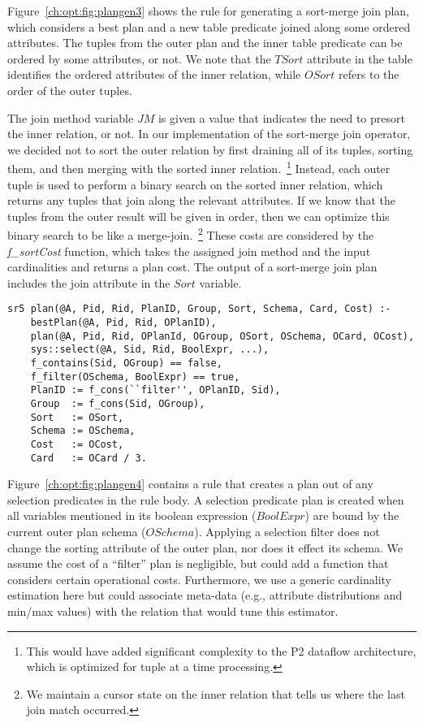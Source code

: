 Figure~\ref{ch:opt:fig:plangen3} shows the rule for generating a sort-merge
join plan, which considers a best plan and a new table predicate joined along
some ordered attributes.  The tuples from the outer plan and the inner table
predicate can be ordered by some attributes, or not.  We note that the $TSort$
attribute in the  table identifies the ordered attributes of the
inner relation, while $OSort$ refers to the order of the outer tuples.  

The join method variable $JM$ is given a value that indicates the need to
presort the inner relation, or not.  In our implementation of the sort-merge
join operator, we decided not to sort the outer relation by first draining all
of its tuples, sorting them, and then merging with the sorted inner
relation.~\footnote{This would have added significant complexity to the P2
dataflow architecture, which is optimized for tuple at a time processing.}
Instead, each outer tuple is used to perform a binary search on the sorted
inner relation, which returns any tuples that join along the relevant
attributes.  If we know that the tuples from the outer result will be given in
order, then we can optimize this binary search to be like a
merge-join.~\footnote{We maintain a cursor state on the inner relation that
tells us where the last join match occurred.} These costs are considered by the
{\em f\_sortCost} function, which takes the assigned join method and the input
cardinalities and returns a plan cost.  The output of a sort-merge join plan
includes the join attribute in the $Sort$ variable.

\begin{figure*}
\ssp
\centering
\begin{lstlisting}
sr5 plan(@A, Pid, Rid, PlanID, Group, Sort, Schema, Card, Cost) :-
    bestPlan(@A, Pid, Rid, OPlanID),
    plan(@A, Pid, Rid, OPlanId, OGroup, OSort, OSchema, OCard, OCost),
    sys::select(@A, Sid, Rid, BoolExpr, ...),
    f_contains(Sid, OGroup) == false,
    f_filter(OSchema, BoolExpr) == true,
    PlanID := f_cons(``filter'', OPlanID, Sid),
    Group  := f_cons(Sid, OGroup),
    Sort   := OSort,
    Schema := OSchema,
    Cost   := OCost,
    Card   := OCard / 3.
\end{lstlisting}
\caption{\label{ch:opt:fig:plangen4}selection predicate filter plan.}
\end{figure*}

Figure~\ref{ch:opt:fig:plangen4} contains a rule that creates a plan out of any
selection predicates in the rule body.  A selection predicate plan is created
when all variables mentioned in its boolean expression ($BoolExpr$) are bound
by the current outer plan schema ($OSchema$).  Applying a selection filter does
not change the sorting attribute of the outer plan, nor does it effect its
schema.  We assume the cost of a ``filter'' plan is negligible, but could
add a function that considers certain operational costs.  Furthermore,
we use a generic cardinality estimation here but could associate meta-data
(e.g., attribute distributions and min/max values) with the  relation
that would tune this estimator.

